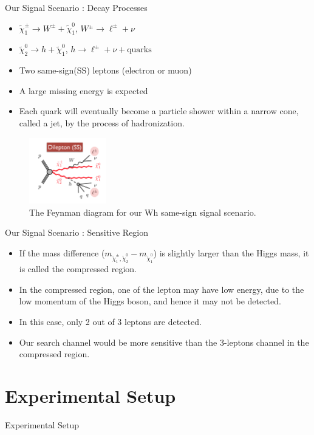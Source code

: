 \documentclass[mathserif,serif]{beamer}
\begin{document}
\begin{frame}{Our Signal Scenario : Decay Processes}
\begin{itemize}
\item $\tilde{\chi}_1^\pm \rightarrow W^{\pm} + \tilde{\chi}_1^0$, $W{^\pm} \rightarrow \ell^{\pm} + \nu$
\item $\tilde{\chi}_2^0 \rightarrow h + \tilde{\chi}_1^0$, $h \rightarrow \ell^{\pm} + \nu + \text{quarks}$
\item Two same-sign(SS) leptons (electron or muon)
\item A large missing energy is expected
\item Each quark will eventually become a particle shower within a narrow cone, called a jet, by the process of hadronization.
\end{itemize}
\begin{figure}
\centering
\includegraphics[width=0.3\textwidth]{data/photo/theory/signal_feynman.png}
\caption{The Feynman diagram for our Wh same-sign signal scenario.}
\end{figure}
\end{frame}

\begin{frame}{Our Signal Scenario : Sensitive Region}
\begin{itemize}
\item If the mass difference ($m_{\tilde{\chi}_1^\pm , \tilde{\chi}_2^0} - m_{\tilde{\chi}_1^0}$) is slightly larger than the Higgs mass, it is called the compressed region.
\item In the compressed region, one of the lepton may have low energy, due to the low momentum of the Higgs boson, and hence it may not be detected.
\item In this case, only 2 out of 3 leptons are detected.
\item Our search channel would be more sensitive than the 3-leptons channel in the compressed region.
\end{itemize}
\end{frame}

\section{Experimental Setup}
\begin{frame}
\begin{center}
\huge
Experimental Setup
\end{center}
\end{frame}
\end{document}
